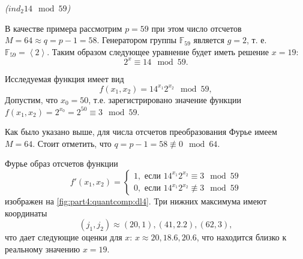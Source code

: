 \begin{example}
\emph{($ind_2{14} \mod{59}$)}

В качестве примера рассмотрим $p = 59$ при этом число отсчетов $M = 64
\approx q = p - 1 = 58$. Генератором группы $\mathbb{F}_{59}$
является $g = 2$, т. е. $\mathbb{F}_{59} = \left<2\right>$. Таким
образом следующее уравнение будет иметь решение $x = 19$:
\[
2^x \equiv 14 \mod 59.
\] 

Исследуемая функция имеет вид
\[
f(x_1, x_2) = 14^{x_1} 2^{x_2} \mod 59,
\]
Допустим, что $x_0 = 50$, т.е. зарегистрировано значение функции
$f(x_1, x_2) = 2^{x_0} = 2^{50} \equiv 3 \mod 59$.



Как было указано выше, для числа отсчетов преобразования Фурье имеем $M=64$. Стоит отметить,
что $q = p - 1 = 58 \not\equiv 0 \mod 64$.

Фурье образ отсчетов функции 
\[
f'(x_1, x_2) = 
\begin{cases}
1, \mbox{ если } 14^{x_1} 2^{x_2} \equiv 3 \mod 59 \\
0, \mbox{ если } 14^{x_1} 2^{x_2} \not\equiv 3 \mod 59 
\end{cases}
\]
изображен на \autoref{fig:part4:quantcomp:dl4}. 
Три нижних максимума имеют координаты 
\[
(j_1, j_2) \approx (20,1), (41,2.2), (62,3), 
\]
что дает следующие оценки для $x$: $x \approx 20, 18.6, 20.6$,
что находится близко к реальному значению $x = 19$.
\label{ex:part4:quantcomp:discretlog:periodfinding3}
\end{example}




